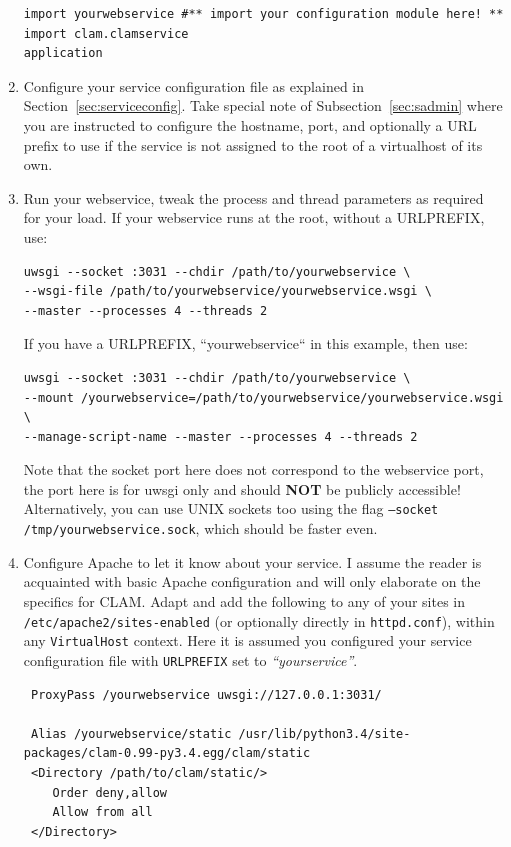 \documentclass[a4paper,12pt,twoside,openright]{report}
\begin{document}
\begin{enumerate}[leftmargin=5mm]
{\begin{verbatim}
import yourwebservice #** import your configuration module here! **
import clam.clamservice
application\end{verbatim}
}
 
\item Configure your service configuration file as explained in
Section~\ref{sec:serviceconfig}. Take special note of
Subsection~\ref{sec:sadmin} where you are instructed to configure the
hostname, port, and optionally a URL prefix to use if the service is not
assigned to the root of a virtualhost of its own. 
\item Run your webservice, tweak the process and thread parameters as required
    for your load. If your webservice runs at the root, without a
    URLPREFIX, use:
{ \small
\begin{verbatim}
uwsgi --socket :3031 --chdir /path/to/yourwebservice \ 
--wsgi-file /path/to/yourwebservice/yourwebservice.wsgi \
--master --processes 4 --threads 2
\end{verbatim}
}
If you have a URLPREFIX, ``yourwebservice`` in this example, then use:
{ \small
\begin{verbatim}
uwsgi --socket :3031 --chdir /path/to/yourwebservice \
--mount /yourwebservice=/path/to/yourwebservice/yourwebservice.wsgi \
--manage-script-name --master --processes 4 --threads 2
\end{verbatim}
}

Note that the socket port here does not correspond to the webservice port, the
port here is for uwsgi only and should \textbf{NOT} be publicly accessible!
Alternatively, you can use UNIX sockets too using the flag \texttt{--socket
/tmp/yourwebservice.sock}, which should be faster even.
\item Configure Apache to let it know about your service. I assume the
reader is acquainted with basic Apache configuration and will only elaborate
on the specifics for CLAM. Adapt and add the following to any of your sites
in \texttt{/etc/apache2/sites-enabled} (or optionally directly in
\texttt{httpd.conf}), within any \texttt{VirtualHost} context. Here it is
assumed you configured your service configuration file with
\texttt{URLPREFIX} set to \emph{``yourservice''}.

{\small
\begin{verbatim}
 ProxyPass /yourwebservice uwsgi://127.0.0.1:3031/

 Alias /yourwebservice/static /usr/lib/python3.4/site-packages/clam-0.99-py3.4.egg/clam/static
 <Directory /path/to/clam/static/>
    Order deny,allow
    Allow from all
 </Directory>
\end{verbatim}
}


\end{enumerate}
\end{document}
